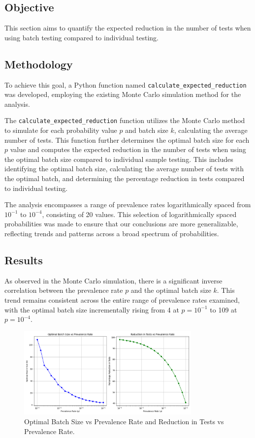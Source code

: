 \documentclass[12pt]{article}
\begin{document}
\subsection*{Objective}
This section aims to quantify the expected reduction in the number of tests when using batch testing compared to individual testing.

\subsection*{Methodology}
To achieve this goal, a Python function named \texttt{calculate\_expected\_reduction} was developed, employing the existing Monte Carlo simulation method for the analysis.

The \texttt{calculate\_expected\_reduction} function utilizes the Monte Carlo method to simulate for each probability value \( p \) and batch size \( k \), calculating the average number of tests. This function further determines the optimal batch size for each \( p \) value and computes the expected reduction in the number of tests when using the optimal batch size compared to individual sample testing. This includes identifying the optimal batch size, calculating the average number of tests with the optimal batch, and determining the percentage reduction in tests compared to individual testing.

The analysis encompasses a range of prevalence rates logarithmically spaced from \( 10^{-1} \) to \( 10^{-4} \), consisting of 20 values. This selection of logarithmically spaced probabilities was made to ensure that our conclusions are more generalizable, reflecting trends and patterns across a broad spectrum of probabilities.

\subsection*{Results}

As observed in the Monte Carlo simulation, there is a significant inverse correlation between the prevalence rate \( p \) and the optimal batch size \( k \). This trend remains consistent across the entire range of prevalence rates examined, with the optimal batch size incrementally rising from 4 at \( p = 10^{-1} \) to 109 at \( p = 10^{-4} \).

\begin{figure}[ht]
\centering
\includegraphics[width=0.8\textwidth]{image/1_OptimalSizeAndReduction.png}
\caption{Optimal Batch Size vs Prevalence Rate and Reduction in Tests vs Prevalence Rate.}
\end{figure}
\end{document}
